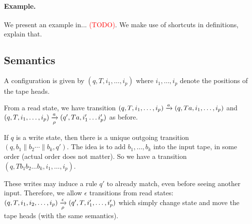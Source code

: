 \paragraph*{Example.} We present an example in... \textcolor{red}{(TODO)}. We make use of shortcuts in definitions, explain that.

\subsection{Semantics}

A configuration is given by $(q, T, i_1, \dots, i_p)$ where $i_1, \dots, i_p$ denote the positions of the tape heads. 

From a read state, we have transition $(q, T, i_1, \dots, i_p) \xrightarrow{a} (q, Ta, i_1, \dots, i_p)$ and $(q, T, i_1, \dots, i_p) \xrightarrow[\rho]{a} (q', Ta, i'_1 \dots i'_p)$ as before. 

If $q$ is a write state, then there is a unique outgoing transition $(q, b_1 \parallel b_2 \cdots \parallel b_k, q')$. The idea is to add $b_1, \dots, b_k$ into the input tape, in some order (actual order does not matter). So we have a transition $(q, Tb_1 b_2 \dots b_k, i_1, \dots, i_p)$.


These writes may induce a rule $q'$ to already match, even before seeing another input. Therefore, we allow $\epsilon$ transitions from read states: $(q, T, i_1, i_2, \dots, i_p) \xrightarrow[\rho]{\epsilon} (q', T, i'_1, \dots, i'_p)$ which simply change state and move the tape heads (with the same semantics). 